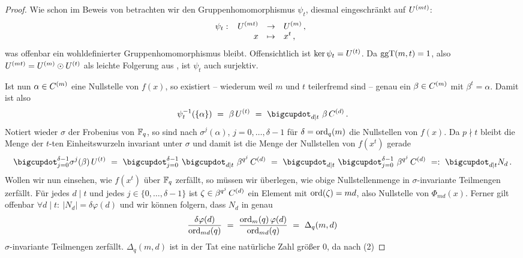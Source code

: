 \begin{proof}
  Wie schon im Beweis von
   betrachten wir
  den Gruppenhomomorphismus $\psi_t$, diesmal eingeschränkt auf $U^{(mt)}$:
  \[ \psi_t:\ \funcdef{U\kl{mt} & \to& U\kl m\,,\\
    x &\mapsto& x^t\,,}\]
  was offenbar ein wohldefinierter Gruppenhomomorphismus bleibt.
  Offensichtlich ist $\ker\psi_t = U^{(t)}$. Da $\operatorname{ggT}(m,t) = 1$, also 
  $U^{(mt)} = U^{(m)} \odot U^{(t)}$ als leichte Folgerung aus
  , ist $\psi_t$ auch surjektiv.

  Ist nun $\alpha \in C^{(m)}$ eine Nullstelle von $f(x)$, 
  so existiert -- wiederum
  weil $m$ und $t$ teilerfremd sind -- genau ein $\beta \in C^{(m)}$ mit
  $\beta^t = \alpha$. Damit ist also
  \[ \psi_t\inv(\{\alpha\}) \speq= \beta\, U\kl t \speq=
    \bigcupdot_{d\mid t}\ \beta\, C\kl d \,.\]
  Notiert wieder $\sigma$ der Frobenius von
  $\mathbb{F}_q$, so sind nach 
  $\sigma^j(\alpha)$, $j=0,\ldots,\delta-1$ für 
  $\delta=\operatorname{ord}_q(m)$ die Nullstellen von $f(x)$. Da $p\nmid t$ bleibt
  die Menge der $t$-ten Einheitswurzeln invariant unter $\sigma $ und 
  damit ist die Menge der Nullstellen von $f(x^t)$ gerade
  \begin{equation}
    \bigcupdot_{j=0}^{\delta-1} \sigma^j(\beta)\, U\kl t \speq=
    \bigcupdot_{j=0}^{\delta-1}\ \bigcupdot_{d\mid t}\ \beta^{q^j}\, C\kl d
    \speq=
    \bigcupdot_{d\mid t}\ \bigcupdot_{j=0}^{\delta-1}\ \beta^{q^j}\, C\kl d
    \speq{=:} \bigcupdot_{d\mid t} N_d\,. 
  \end{equation}
  Wollen wir nun einsehen, wie $f(x^t)$ über $\mathbb{F}_q$ zerfällt, so müssen wir
  überlegen, wie obige Nullstellenmenge in $\sigma$-invariante Teilmengen
  zerfällt. Für jedes $d\mid t$ und jedes $j\in\{0,\ldots,\delta -1\}$ ist
  $\zeta \in \beta^{q^j}\,C^{(d)}$ ein Element mit $\operatorname{ord}(\zeta) = md$, also
  Nullstelle von $\Phi_{md}(x)$. Ferner gilt
  offenbar $\forall d\mid t:\ |N_d| = \delta\varphi(d)$
  und wir können folgern, dass $N_d$ in genau
  \[ \frac{\delta\varphi(d)}{\operatorname{ord}_{md}(q)} \ =\  \frac{\operatorname{ord}_m(q)\,
    \varphi(d)}{\operatorname{ord}_{md}(q)} \ =\ 
    \Delta_q(m,d)\]
  $\sigma$-invariante Teilmengen zerfällt. $\Delta_q(m,d)$ ist in der Tat eine
  natürliche Zahl größer 0, da nach  (2)

\end{proof}
